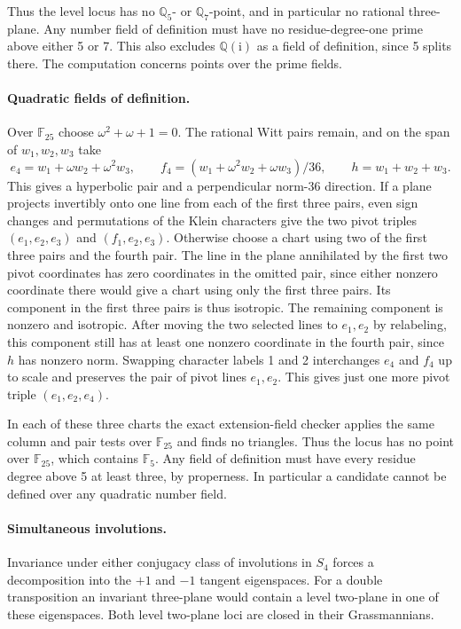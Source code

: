 Thus the level locus has no \(\mathbb Q_5\)- or \(\mathbb Q_7\)-point,
and in particular no rational three-plane. Any number field of definition
must have no residue-degree-one prime above either 5 or 7. This also
excludes \(\mathbb Q(\mathrm i)\) as a field of definition, since 5 splits
there. The computation concerns points over the prime fields.

\paragraph{Quadratic fields of definition.}
Over \(\mathbb F_{25}\) choose \(\omega^2+\omega+1=0\). The rational
Witt pairs remain, and on the span of \(w_1,w_2,w_3\) take
\begin{equation*}
 e_4=w_1+\omega w_2+\omega^2w_3,\qquad
 f_4=(w_1+\omega^2w_2+\omega w_3)/36,\qquad h=w_1+w_2+w_3.
\end{equation*}
This gives a hyperbolic pair and a perpendicular norm-36 direction.
If a plane projects invertibly onto one line from each of the first
three pairs, even sign changes and permutations of the Klein
characters give the two pivot triples \((e_1,e_2,e_3)\) and
\((f_1,e_2,e_3)\). Otherwise choose a chart using two of the first
three pairs and the fourth pair. The line in the plane annihilated by
the first two pivot coordinates has zero coordinates in the omitted
pair, since either nonzero coordinate there would give a chart using
only the first three pairs. Its component in the first three pairs
is thus isotropic. The remaining component is nonzero and isotropic.
After moving the two selected lines to \(e_1,e_2\) by relabeling,
this component still has at least one nonzero coordinate in the
fourth pair, since \(h\) has nonzero norm. Swapping character labels
1 and 2 interchanges \(e_4\) and \(f_4\) up to scale and preserves
the pair of pivot lines \(e_1,e_2\). This gives just one more pivot
triple \((e_1,e_2,e_4)\).

In each of these three charts the exact extension-field checker
applies the same column and pair tests over \(\mathbb F_{25}\) and
finds no triangles. Thus the locus has no point over
\(\mathbb F_{25}\), which contains \(\mathbb F_5\). Any field of
definition must have every residue degree above 5 at least three,
by properness. In particular a candidate cannot be defined over
any quadratic number field.

\paragraph{Simultaneous involutions.}
Invariance under either conjugacy class of involutions in \(S_4\)
forces a decomposition into the \(+1\) and \(-1\) tangent
eigenspaces. For a double transposition an invariant three-plane
would contain a level two-plane in one of these eigenspaces.
Both level two-plane loci are closed in their Grassmannians.

